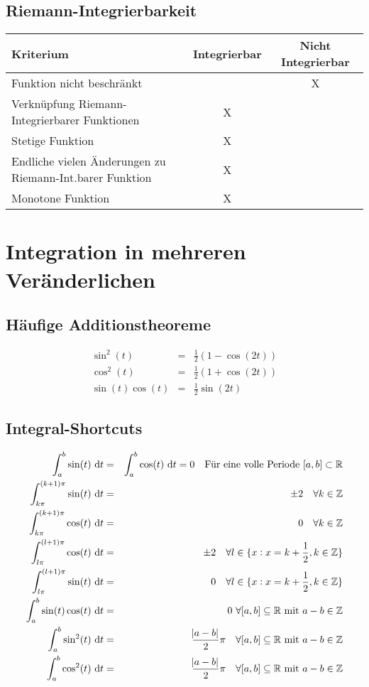 \section{Riemann-Integrierbarkeit}
\begin{center}
    \begin{tabular}{lcc}
        \toprule
        Kriterium & Integrierbar & Nicht Integrierbar \\
        \midrule
        Funktion nicht beschränkt & & X \\
        Verknüpfung Riemann-Integrierbarer Funktionen & X \\
        Stetige Funktion & X\\
        Endliche vielen Änderungen zu Riemann-Int.barer Funktion & X\\
        Monotone Funktion & X\\
        \bottomrule
    \end{tabular}
\end{center}

\chapter{Integration in mehreren Veränderlichen}
\section{Häufige Additionstheoreme}
\begin{eqnarray*}
    \sin^2(t) &=& \frac{1}{2} (1 - \cos(2t))\\
    \cos^2(t) &=& \frac{1}{2} (1 + \cos(2t))\\
    \sin(t) \cos(t) &=& \frac{1}{2} \sin(2t)
\end{eqnarray*}

\section{Integral-Shortcuts}
\begin{eqnarray*}
    \int_{a}^{b}{\sin(t)\text{ d}t} &=& \int_{a}^{b}{\cos(t)\text{ d}t} = 0 \quad \text{Für eine volle Periode} \ [a,b] \subset \mathbb{R} \\
    \int_{k\pi}^{(k+1)\pi}{\sin(t)\text{ d}t} &=& \pm 2 \quad \forall k \in \mathbb{Z} \\
    \int_{k\pi}^{(k+1)\pi}{\cos(t)\text{ d}t} &=& 0 \quad \forall k \in \mathbb{Z} \\
    \int_{l\pi}^{(l+1)\pi}{\cos(t)\text{ d}t} &=& \pm 2 \quad \forall l \in \{x:x=k+\frac{1}{2}, k\in\mathbb{Z}\} \\
    \int_{l\pi}^{(l+1)\pi}{\sin(t)\text{ d}t} &=& 0 \quad \forall l \in \{x:x=k+\frac{1}{2}, k\in\mathbb{Z}\} \\
    \int_{a}^{b}{\sin(t)\cos(t)\text{ d}t} &=& 0 \ \forall [a,b]\subseteq\mathbb{R} \ \text{mit} \ a-b\in\mathbb{Z} \\
    \int_{a}^{b}{\sin^2(t)\text{ d}t} &=& \frac{\abs{a-b}}{2}\pi \quad \forall [a,b]\subseteq\mathbb{R} \ \text{mit} \ a-b\in\mathbb{Z} \\
    \int_{a}^{b}{\cos^2(t)\text{ d}t} &=& \frac{\abs{a-b}}{2}\pi \quad \forall [a,b]\subseteq\mathbb{R} \ \text{mit} \ a-b\in\mathbb{Z}
\end{eqnarray*}
